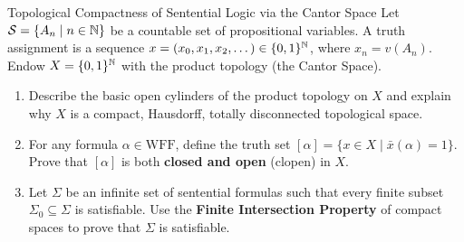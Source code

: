 \begin{exercise}{Topological Compactness of Sentential Logic via the Cantor Space}
Let $\mathcal{S} = \{A_n \mid n \in \mathbb{N}\}$ be a countable set of propositional variables.
A truth assignment is a sequence $x = (x_0, x_1, x_2, \dots) \in \{0, 1\}^{\mathbb{N}}$, where $x_n = v(A_n)$.
Endow $X = \{0, 1\}^{\mathbb{N}}$ with the product topology (the Cantor Space).
\begin{enumerate}[leftmargin=1.5em,itemsep=2pt]
  \item Describe the basic open cylinders of the product topology on $X$ and explain why $X$ is a compact, Hausdorff, totally disconnected topological space.
  \item For any formula $\alpha \in \mathrm{WFF}$, define the truth set $[\alpha] = \{ x \in X \mid \bar{x}(\alpha) = 1 \}$.
  Prove that $[\alpha]$ is both \textbf{closed and open} (clopen) in $X$.
  \item Let $\Sigma$ be an infinite set of sentential formulas such that every finite subset $\Sigma_0 \subseteq \Sigma$ is satisfiable.
  Use the \textbf{Finite Intersection Property} of compact spaces to prove that $\Sigma$ is satisfiable.
\end{enumerate}
\end{exercise}

\begin{tabletworkspace}[5.0cm]
\end{tabletworkspace}

